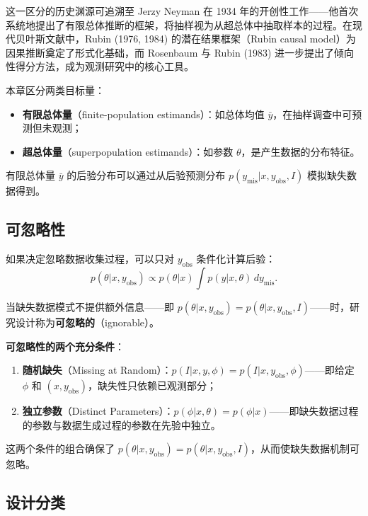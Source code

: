 这一区分的历史渊源可追溯至 Jerzy Neyman 在 1934 年的开创性工作——他首次系统地提出了有限总体推断的框架，将抽样视为从超总体中抽取样本的过程。在现代贝叶斯文献中，Rubin (1976, 1984) 的潜在结果框架（Rubin causal model）为因果推断奠定了形式化基础，而 Rosenbaum 与 Rubin (1983) 进一步提出了倾向性得分方法，成为观测研究中的核心工具。

本章区分两类目标量：
\begin{itemize}
  \item \textbf{有限总体量}（finite-population estimands）：如总体均值 $\bar{y}$，在抽样调查中可预测但未观测；
  \item \textbf{超总体量}（superpopulation estimands）：如参数 $\theta$，是产生数据的分布特征。
\end{itemize}

有限总体量 $\bar{y}$ 的后验分布可以通过从后验预测分布 $p(y_{\mathrm{mis}}|x, y_{\mathrm{obs}}, I)$ 模拟缺失数据得到。

\subsection{可忽略性}

如果决定忽略数据收集过程，可以只对 $y_{\mathrm{obs}}$ 条件化计算后验：
\begin{equation}
p(\theta|x, y_{\mathrm{obs}}) \propto p(\theta|x) \int p(y|x, \theta) \, dy_{\mathrm{mis}}. \label{eq:ch8-ignorable-posterior}
\end{equation}

当缺失数据模式不提供额外信息——即 $p(\theta|x, y_{\mathrm{obs}}) = p(\theta|x, y_{\mathrm{obs}}, I)$——时，研究设计称为\textbf{可忽略的}（ignorable）。

\textbf{可忽略性的两个充分条件}：
\begin{enumerate}
  \item \textbf{随机缺失}（Missing at Random）：$p(I|x, y, \phi) = p(I|x, y_{\mathrm{obs}}, \phi)$——即给定 $\phi$ 和 $(x, y_{\mathrm{obs}})$，缺失性只依赖已观测部分；
  \item \textbf{独立参数}（Distinct Parameters）：$p(\phi|x, \theta) = p(\phi|x)$——即缺失数据过程的参数与数据生成过程的参数在先验中独立。
\end{enumerate}

\begin{Remark}
  这两个条件的组合确保了 $p(\theta|x, y_{\mathrm{obs}}) = p(\theta|x, y_{\mathrm{obs}}, I)$，从而使缺失数据机制可忽略。
\end{Remark}

\subsection{设计分类}

